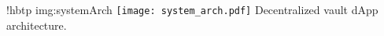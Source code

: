 \namedfigure
{!hbtp}
{img:systemArch}
{\texttt{[image: system\_arch.pdf]}}
{Decentralized vault dApp architecture.}
